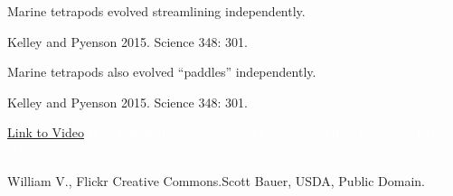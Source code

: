 \documentclass[t]{beamer}
\begin{document}
%
{
\begin{frame}[b]{Marine tetrapods evolved streamlining independently.}

	\hfill \tiny Kelley and Pyenson 2015. Science 348: 301.

\end{frame}
}
%
{
\begin{frame}[b]{Marine tetrapods also evolved “paddles” independently.}

	\hfill {}

\end{frame}
}
%
{
\begin{frame}[b]

	\hfill \tiny Kelley and Pyenson 2015. Science 348: 301.

\end{frame}
}
%
{
\begin{frame}[b]
\end{frame}
}
%
{
\begin{frame}[b]
\end{frame}
}
%
{
\begin{frame}[b]

	\tiny\textcolor{white}{\href{http://www.youtube.com/watch?v=Cdiapvktzkw}{Link to Video}
	\hfill
	Based on Waters et al. 2012. Modeling huddling penguins. PLoS ONE 7: e50277.}

\end{frame}
}
%
{
\begin{frame}[b]

	\tiny William V., Flickr Creative Commons.\hfill Scott Bauer, USDA, Public Domain.

\end{frame}
}
\end{document}
